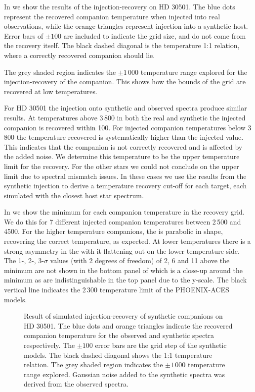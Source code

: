 In  we show the results of the injection-recovery on {HD 30501}. The blue dots represent the recovered companion temperature when injected into real observations, while the orange triangles represent injection into a synthetic host. Error bars of \(\pm100\)\K{} are included to indicate the grid size, and do not come from the recovery itself. The black dashed diagonal is the temperature 1:1 relation, where a correctly recovered companion should lie.

The grey shaded region indicates the \(\pm1\,000\)\K{} temperature range explored for the injection-recovery of the companion. This shows how the bounds of the grid are recovered at low temperatures.

For {HD 30501} the injection onto synthetic and observed spectra produce similar results. At temperatures above 3\,800\K{} in both the real and synthetic the injected companion is recovered within 100\K{}. For injected companion temperatures below 3\,800\K{} the temperature recovered is systematically higher than the injected value. This indicates that the companion is not correctly recovered and is affected by the added noise. We determine this temperature to be the upper temperature limit for the recovery. For the other stars we could not conclude on the upper limit due to spectral mismatch issues. In these cases we use the results from the synthetic injection to derive a temperature recovery cut-off for each target, each simulated with the closest host star spectrum.

In  we show the minimum \textchisquared{} for each companion temperature in the recovery grid. We do this for 7 different injected companion temperatures between 2\,500 and 4500\K{}. For the higher temperature companions, the \textchisquared{} is parabolic in shape, recovering the correct temperature, as expected. At lower temperatures there is a strong asymmetry in the \textchisquared{} with it flattening out on the lower temperature side.
The 1-, 2-, 3-\(\sigma\) values (with 2 degrees of freedom) of 2, 6 and 11 above the minimum \textchisquared{} are not shown in the bottom panel of  which is a close-up around the minimum \textchisquared{} as are indistinguishable in the top panel due to the \textchisquared{} y-scale. The black vertical line indicates the 2\,300\K{} temperature limit of the {PHOENIX-ACES} models.

\begin{figure}
    \centering
    \caption{Result of simulated injection-recovery of synthetic companions on {HD 30501}. The blue dots and orange triangles indicate the recovered companion temperature for the observed and synthetic spectra respectively. The \(\pm100\)\K{} error bars are the grid step of the synthetic models. The black dashed diagonal shows the 1:1 temperature relation. The grey shaded region indicates the \(\pm1\,000\)\K{} temperature range explored. Gaussian noise added to the synthetic spectra was derived from the observed spectra.}
    \label{fig:injection-recovery}
\end{figure}



